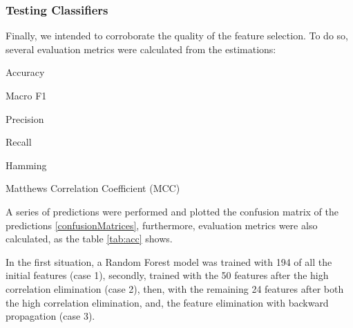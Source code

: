 \begin{table}[H]
	\caption{Selected features.}
	\centering
	\label{tab:selectedFeat}
\end{table}



\subsubsection{Testing Classifiers}\label{metrics}

Finally, we intended to corroborate the quality of the feature selection. To do so, several evaluation metrics were calculated from the estimations: \begin{enumerate*}
	\item Accuracy
	\item Macro F1
	\item Precision
	\item Recall
	\item Hamming
	\item Matthews Correlation Coefficient (MCC)
\end{enumerate*}

A series of predictions were performed and plotted the confusion matrix of the predictions \ref{confusionMatrices}, furthermore, evaluation metrics were also calculated, as the table \ref{tab:acc} shows. 

In the first situation, a Random Forest model was trained with 194 of all the initial features (case 1), secondly, trained with the 50 features after the high correlation elimination (case 2), then, with the remaining 24 features after both the high correlation elimination, and, the feature elimination with backward propagation (case 3).


